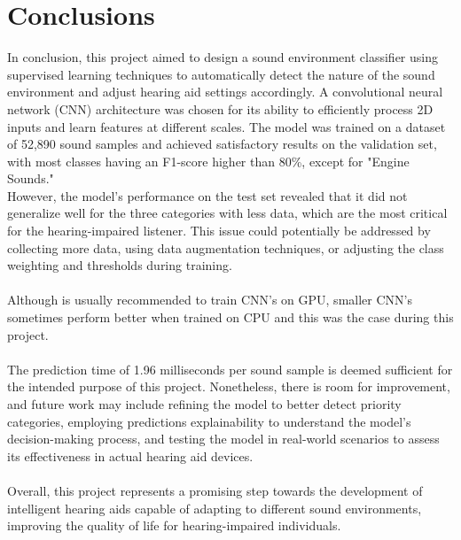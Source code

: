 \documentclass[12pt,oneside,a4paper,english]{article}
\begin{document}
\section{Conclusions}
In conclusion, this project aimed to design a sound environment classifier using supervised learning techniques to automatically detect the nature of the sound environment and adjust hearing aid settings accordingly. A convolutional neural network (CNN) architecture was chosen for its ability to efficiently process 2D inputs and learn features at different scales. The model was trained on a dataset of 52,890 sound samples and achieved satisfactory results on the validation set, with most classes having an F1-score higher than 80\%, except for "Engine Sounds."
\\
However, the model's performance on the test set revealed that it did not generalize well for the three categories with less data, which are the most critical for the hearing-impaired listener. This issue could potentially be addressed by collecting more data, using data augmentation techniques, or adjusting the class weighting and thresholds during training.
\\
\\
Although is usually recommended to train CNN's on GPU, smaller CNN's sometimes perform better when trained on CPU and this was the case during this project.
\\
\\
The prediction time of 1.96 milliseconds per sound sample is deemed sufficient for the intended purpose of this project. Nonetheless, there is room for improvement, and future work may include refining the model to better detect priority categories, employing predictions explainability to understand the model's decision-making process, and testing the model in real-world scenarios to assess its effectiveness in actual hearing aid devices.
\\
\\
Overall, this project represents a promising step towards the development of intelligent hearing aids capable of adapting to different sound environments, improving the quality of life for hearing-impaired individuals.
\end{document}
